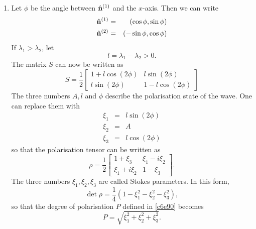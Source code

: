 \begin{enumerate}
\item Let $\phi$ be the angle between $\hat{\mathbf{n}}^{(1)}$ and the $x$-axis. Then we can 
write
\begin{eqnarray}
\hat{\mathbf{n}}^{(1)} &=& (\cos\phi, \sin\phi) \label{c6e100} \\
\hat{\mathbf{n}}^{(2)} &=& (-\sin\phi, \cos\phi) \label{c6e101}
\end{eqnarray}
If $\lambda_1 > \lambda_2$, let
\begin{equation}\label{c6e102}
l = \lambda_1 - \lambda_2 > 0.
\end{equation}
The matrix $S$ can now be written as
\begin{equation}\label{c6e103}
S = \frac{1}{2}\begin{bmatrix}
1 + l\cos(2\phi) & l\sin(2\phi) \\
l\sin(2\phi) & 1 - l\cos(2\phi)
\end{bmatrix}
\end{equation}
The three numbers $A, l$ and $\phi$ describe the polarisation state of the wave.
One can replace them with
\begin{eqnarray}
\xi_1 &=& l\sin(2\phi) \label{c6e104} \\
\xi_2 &=& A \label{c6e105} \\
\xi_3 &=& l\cos(2\phi) \label{c6e106}
\end{eqnarray}
so that the polarisation tensor can be written as
\begin{equation}\label{c6e107}
\rho = \frac{1}{2}\begin{bmatrix}
1 + \xi_3 & \xi_1 - i\xi_2 \\
\xi_1 + i\xi_2 & 1 - \xi_3
\end{bmatrix}.
\end{equation}
The three numbers $\xi_1, \xi_2, \xi_3$ are called Stokes parameters. In this form,
\begin{equation}\label{c6e108}
\det\rho = \frac{1}{4}(1 - \xi_1^2 - \xi_2^2 - \xi_3^2),
\end{equation}
so that the degree of polarisation $P$ defined in \eqref{c6e90} becomes
\begin{equation}\label{c6e109}
P = \sqrt{\xi_1^2 + \xi_2^2 + \xi_3^2}.
\end{equation}
\end{enumerate}
